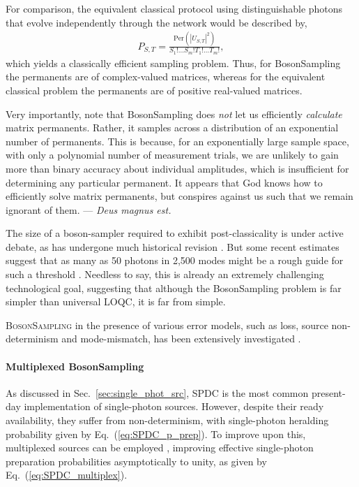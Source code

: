 \documentclass[aps, rmp, twocolumn, amsmath, amssymb, nofootinbib, superscriptaddress, longbibliography, floatfix, table-of-contents, eqsecnum]{revtex4-1}
\begin{document}
For comparison, the equivalent classical protocol using distinguishable photons that evolve independently through the network would be described by,
\begin{align}
	P_{S,T} = \frac{\text{Per}(|U_{S,T}|^2)}{S_1!\dots S_m! T_1!\dots T_m!},
\end{align}
which yields a classically efficient sampling problem. Thus, for {\sc BosonSampling} the permanents are of complex-valued matrices, whereas for the equivalent classical problem the permanents are of positive real-valued matrices.

Very importantly, note that {\sc BosonSampling} does \textit{not} let us efficiently \textit{calculate} matrix permanents. Rather, it samples across a distribution of an exponential number of permanents. This is because, for an exponentially large sample space, with only a polynomial number of measurement trials, we are unlikely to gain more than binary accuracy about individual amplitudes, which is insufficient for determining any particular permanent. It appears that God knows how to efficiently solve matrix permanents, but conspires against us such that we remain ignorant of them. --- \textit{Deus magnus est.}

The size of a boson-sampler required to exhibit post-classicality is under active debate, as has undergone much historical revision \cite{RohdeRalph}. But some recent estimates suggest that as many as 50 photons in 2,500 modes might be a rough guide for such a threshold \cite{NoSupBS_Montanaro}. Needless to say, this is already an extremely challenging technological goal, suggesting that although the {\sc BosonSampling} problem is far simpler than universal LOQC, it is far from simple.

\textsc{BosonSampling} in the presence of various error models, such as loss, source non-determinism and mode-mismatch, has been extensively investigated \cite{bib:RohdeErrBS12, bib:RohdeSPDC13, bib:ScottLost16, bib:RohdeArbSpec15, bib:RandBS}. 

%
%

\paragraph{Multiplexed {\sc BosonSampling}} 

As discussed in Sec.~\ref{sec:single_phot_src}, SPDC is the most common present-day implementation of single-photon sources. However, despite their ready availability, they suffer from non-determinism, with single-photon heralding probability given by Eq.~(\ref{eq:SPDC_p_prep}). To improve upon this, multiplexed sources can be employed \cite{bib:RohdeSPDC13}, improving effective single-photon preparation probabilities asymptotically to unity, as given by Eq.~(\ref{eq:SPDC_multiplex}).
\end{document}
